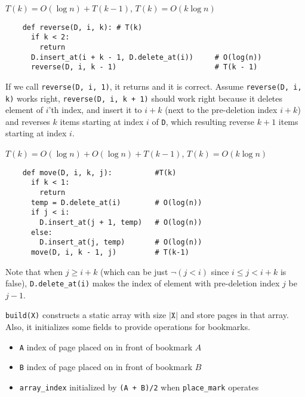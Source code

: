 \documentclass[12pt,twoside]{article}
\begin{document}
\begin{problems}
\begin{problemparts}
\end{problemparts}

\newpage
\problem  %

\begin{problemparts}
  \problempart %
  $T(k) = O(\log n) + T(k - 1)$, $T(k) = O(k\log n)$
  \begin{lstlisting}
    def reverse(D, i, k): # T(k)
      if k < 2:
        return
      D.insert_at(i + k - 1, D.delete_at(i))     # O(log(n))
      reverse(D, i, k - 1)                       # T(k - 1)
  \end{lstlisting}
  If we call \texttt{reverse(D, i, 1)}, it returns and it is correct.
  Assume \texttt{reverse(D, i, k)} works right, \texttt{reverse(D, i,
    k + 1)} should work right because it deletes element of $i$'th
  index, and insert it to $i + k$ (next to the pre-deletion index
  $i + k$) and reverses $k$ items starting at index $i$ of \texttt{D},
  which resulting reverse $k+1$ items starting at index $i$.
  
  \problempart %
  $T(k) = O(\log n) + O(\log n) + T(k-1)$, $T(k) = O(k\log n)$
  
  \begin{lstlisting}
    def move(D, i, k, j):          #T(k)
      if k < 1:
        return
      temp = D.delete_at(i)        # O(log(n))
      if j < i:
        D.insert_at(j + 1, temp)   # O(log(n))
      else:
        D.insert_at(j, temp)       # O(log(n))
      move(D, i, k - 1, j)         # T(k-1)
  \end{lstlisting}
    
  Note that when $j\geq i + k$ (which can be just $\neg(j < i)$ since
  $i\leq j < i+k$ is false), \texttt{D.delete\_at(i)} makes
  the index of element with pre-deletion index $j$ be $j-1$.
  
\end{problemparts}

\newpage
\problem %
\texttt{build(X)} constructs a static array with size $|\texttt{X}|$
and store pages in that array. Also, it initializes some fields to
provide operations for bookmarks.

\begin{itemize}
\item \texttt{A} index of page placed on in front of bookmark $A$
  
\item \texttt{B} index of page placed on in front of bookmark $B$
  
\item \texttt{array\_index} initialized by \texttt{(A + B)/2} when \texttt{place\_mark} operates
  

\end{itemize}
\end{problems}
\end{document}
